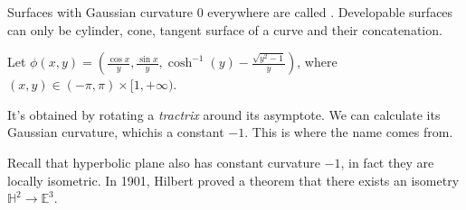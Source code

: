 Surfaces with Gaussian curvature 0 everywhere
are called .
Developable surfaces can only be cylinder, cone, tangent surface of a curve
and their concatenation.

\begin{example}[Pseudosphere]
	Let $\phi(x,y) = (\frac{\cos x}{y}, \frac{\sin x}{y},
	\cosh^{-1}(y) - \frac{\sqrt{y^2-1}}{y})$,
	where $(x,y)\in (-\pi, \pi)\times [1,+\infty)$.

	It's obtained by rotating a \textit{tractrix} around its asymptote.
	We can calculate its Gaussian curvature, whichis a constant $-1$.
	This is where the name comes from.

	Recall that hyperbolic plane also has constant curvature $-1$,
	in fact they are locally isometric.
	In 1901, Hilbert proved a theorem that there exists an isometry
	$\mathbb{H}^2\to \mathbb{E}^3$.
\end{example}
